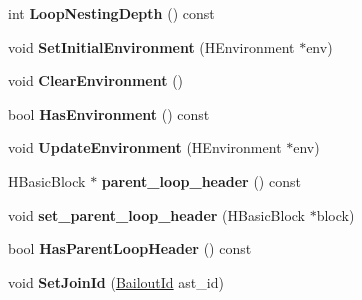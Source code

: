 \begin{DoxyCompactItemize}
\item 
\hypertarget{classv8_1_1internal_1_1_v8___f_i_n_a_l_a8e3be4005747ffd83c65f2486b91c910}{}int {\bfseries Loop\+Nesting\+Depth} () const \label{classv8_1_1internal_1_1_v8___f_i_n_a_l_a8e3be4005747ffd83c65f2486b91c910}

\item 
\hypertarget{classv8_1_1internal_1_1_v8___f_i_n_a_l_a233d59540c799e6e9209d011ac8bd9ab}{}void {\bfseries Set\+Initial\+Environment} (H\+Environment $\ast$env)\label{classv8_1_1internal_1_1_v8___f_i_n_a_l_a233d59540c799e6e9209d011ac8bd9ab}

\item 
\hypertarget{classv8_1_1internal_1_1_v8___f_i_n_a_l_acdce6e83dc7eae6db32da01659581b73}{}void {\bfseries Clear\+Environment} ()\label{classv8_1_1internal_1_1_v8___f_i_n_a_l_acdce6e83dc7eae6db32da01659581b73}

\item 
\hypertarget{classv8_1_1internal_1_1_v8___f_i_n_a_l_a0b04c8908d83fc2793783ac873a77f46}{}bool {\bfseries Has\+Environment} () const \label{classv8_1_1internal_1_1_v8___f_i_n_a_l_a0b04c8908d83fc2793783ac873a77f46}

\item 
\hypertarget{classv8_1_1internal_1_1_v8___f_i_n_a_l_aa0089b1694d873322b18183c993b0b7e}{}void {\bfseries Update\+Environment} (H\+Environment $\ast$env)\label{classv8_1_1internal_1_1_v8___f_i_n_a_l_aa0089b1694d873322b18183c993b0b7e}

\item 
\hypertarget{classv8_1_1internal_1_1_v8___f_i_n_a_l_a48ef8734e7659667adac12ac7c65644b}{}H\+Basic\+Block $\ast$ {\bfseries parent\+\_\+loop\+\_\+header} () const \label{classv8_1_1internal_1_1_v8___f_i_n_a_l_a48ef8734e7659667adac12ac7c65644b}

\item 
\hypertarget{classv8_1_1internal_1_1_v8___f_i_n_a_l_aae19706e6a56de91f490164bb21b402d}{}void {\bfseries set\+\_\+parent\+\_\+loop\+\_\+header} (H\+Basic\+Block $\ast$block)\label{classv8_1_1internal_1_1_v8___f_i_n_a_l_aae19706e6a56de91f490164bb21b402d}

\item 
\hypertarget{classv8_1_1internal_1_1_v8___f_i_n_a_l_ae3f0badb96f8b911363cc291796de703}{}bool {\bfseries Has\+Parent\+Loop\+Header} () const \label{classv8_1_1internal_1_1_v8___f_i_n_a_l_ae3f0badb96f8b911363cc291796de703}

\item 
\hypertarget{classv8_1_1internal_1_1_v8___f_i_n_a_l_acbdb9fab3edb9d0c06880c9a8be070b0}{}void {\bfseries Set\+Join\+Id} (\hyperlink{classv8_1_1internal_1_1_bailout_id}{Bailout\+Id} ast\+\_\+id)\label{classv8_1_1internal_1_1_v8___f_i_n_a_l_acbdb9fab3edb9d0c06880c9a8be070b0}


\end{DoxyCompactItemize}
